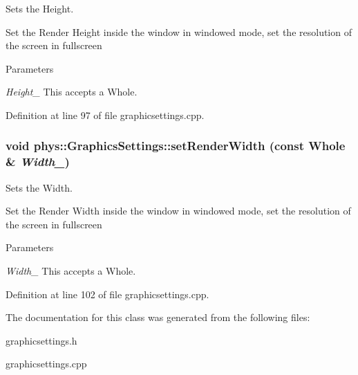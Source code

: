 Sets the Height. 

Set the Render Height inside the window in windowed mode, set the resolution of the screen in fullscreen 
\begin{DoxyParams}{Parameters}
\item[{\em Height\_\-}]This accepts a Whole. \end{DoxyParams}


Definition at line 97 of file graphicsettings.cpp.

\hypertarget{classphys_1_1GraphicsSettings_a7cebb39f829f5e600231b4efc22b9ec3}{
\subsubsection[{setRenderWidth}]{\setlength{\rightskip}{0pt plus 5cm}void phys::GraphicsSettings::setRenderWidth (const {\bf Whole} \& {\em Width\_\-})}}
\label{dc/df1/classphys_1_1GraphicsSettings_a7cebb39f829f5e600231b4efc22b9ec3}


Sets the Width. 

Set the Render Width inside the window in windowed mode, set the resolution of the screen in fullscreen 
\begin{DoxyParams}{Parameters}
\item[{\em Width\_\-}]This accepts a Whole. \end{DoxyParams}


Definition at line 102 of file graphicsettings.cpp.



The documentation for this class was generated from the following files:\begin{DoxyCompactItemize}
\item 
graphicsettings.h\item 
graphicsettings.cpp\end{DoxyCompactItemize}

